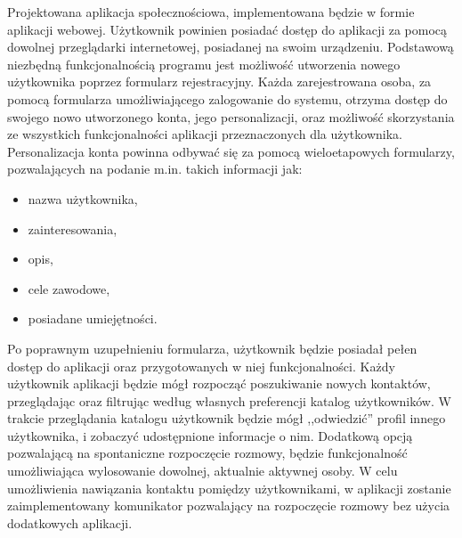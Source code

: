 \documentclass[12pt,a4paper]{article}
\begin{document}
Projektowana aplikacja społecznościowa, implementowana będzie w formie aplikacji webowej. Użytkownik powinien posiadać dostęp do aplikacji za pomocą dowolnej przeglądarki internetowej, posiadanej na swoim urządzeniu. Podstawową niezbędną funkcjonalnością programu jest możliwość utworzenia nowego użytkownika poprzez formularz rejestracyjny. Każda zarejestrowana osoba, za pomocą formularza umożliwiającego zalogowanie do systemu, otrzyma dostęp do swojego nowo utworzonego konta, jego personalizacji, oraz możliwość skorzystania ze wszystkich funkcjonalności aplikacji przeznaczonych dla użytkownika. Personalizacja konta powinna odbywać się za pomocą wieloetapowych formularzy, pozwalających na podanie m.in. takich informacji jak: 
\begin{itemize}
    \item nazwa użytkownika,
    \item zainteresowania, 
    \item opis, 
    \item cele zawodowe, 
    \item posiadane umiejętności.
\end{itemize}
Po poprawnym uzupełnieniu formularza, użytkownik będzie posiadał pełen dostęp do aplikacji oraz przygotowanych w niej funkcjonalności. Każdy użytkownik aplikacji będzie mógł rozpocząć poszukiwanie nowych kontaktów, przeglądając oraz filtrując według własnych preferencji katalog użytkowników. W trakcie przeglądania katalogu użytkownik będzie mógł ,,odwiedzić'' profil innego użytkownika, i zobaczyć udostępnione informacje o nim. Dodatkową opcją pozwalającą na spontaniczne rozpoczęcie rozmowy, będzie funkcjonalność umożliwiająca wylosowanie dowolnej, aktualnie aktywnej osoby. W celu umożliwienia nawiązania kontaktu pomiędzy użytkownikami, w aplikacji zostanie zaimplementowany komunikator pozwalający na rozpoczęcie rozmowy bez użycia dodatkowych aplikacji. 
\end{document}
